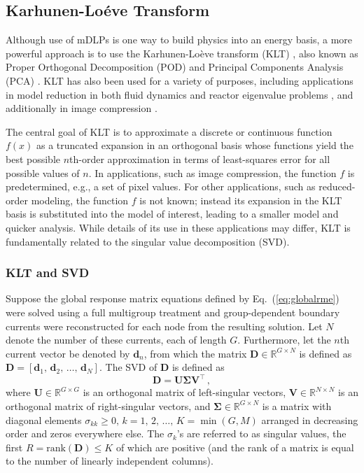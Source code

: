 \documentclass[5p,times,twocolumn,10pt]{elsarticle}
\newcommand{\EQ}[1]{Eq.~(\ref{#1})}               %
\begin{document}
  \subsection{Karhunen-Lo\'{e}ve Transform}
  
  Although use of mDLPs is one way to build physics into 
  an energy basis, a more powerful approach is to use  
  the Karhunen-Lo\`{e}ve transform (KLT) \cite{Dony2001}, also  
  known as Proper Orthogonal Decomposition (POD) \cite{Buchan2013} 
  and Principal Components Analysis (PCA) \cite{Dony2001}.  KLT has also been 
  used for a variety of purposes, including applications in model reduction in both fluid 
  dynamics \cite{Sirovich1987} and reactor eigenvalue problems \cite{Buchan2013},
  and additionally in image compression \cite{Dony2001}.
  
  The central goal of KLT is to approximate a discrete or 
  continuous function $f(x)$ 
  as a truncated expansion in an orthogonal basis whose functions yield the best possible $n$th-order approximation
  in terms of least-squares error for all possible values of $n$.  In applications,
  such as image compression, the function $f$ is predetermined, e.g., a set 
  of pixel values. For other applications, such as reduced-order modeling, 
  the function $f$ is not known; instead 
  its expansion in the KLT basis is substituted into the model of interest,
  leading to a smaller model and quicker analysis.  
  While details of its use in 
  these applications may differ, KLT is fundamentally related to the singular 
  value decomposition (SVD).
  
  \subsubsection{KLT and SVD}
  
  Suppose the global response matrix equations defined 
  by \EQ{eq:globalrme} were solved using a full multigroup 
  treatment and group-dependent boundary currents were 
  reconstructed for each node from the resulting solution.
  Let $N$ denote the number of these currents, each of length 
  $G$.  Furthermore, let the $n$th
  current vector be denoted by $\mathbf{d}_n$, from which 
  the matrix $\mathbf{D} \in \mathbb{R}^{G\times N}$ is defined 
  as $\mathbf{D} = [\mathbf{d}_1,\, \mathbf{d}_2,\, \ldots, \, \mathbf{d}_N]$.
  The SVD of $\mathbf{D}$ is defined as
  \begin{equation}
    \mathbf{D} = \mathbf{U} \bm{\Sigma} \mathbf{V}^{\intercal} \, ,
    \label{eq:svd}
  \end{equation}
  where $\mathbf{U} \in \mathbb{R}^{G\times G}$ is an orthogonal matrix of left-singular vectors,
  $\mathbf{V} \in \mathbb{R}^{N\times N}$ is an orthogonal matrix of right-singular vectors, 
  and  $\bm{\Sigma} \in \mathbb{R}^{G\times N}$ is a matrix with  
  diagonal elements $\sigma_{kk} \geq 0, \,  k = 1,\,2,\, \ldots,\, K = \min(G, M)$
  arranged in decreasing order
  and zeros everywhere else.  
  The $\sigma_k$'s are referred to as singular values, 
  the first $R=\text{rank}(\mathbf{D})\leq K$ of which  
  are positive (and the rank of a matrix is equal to the 
  number of linearly independent columns).  
  
\end{document}
